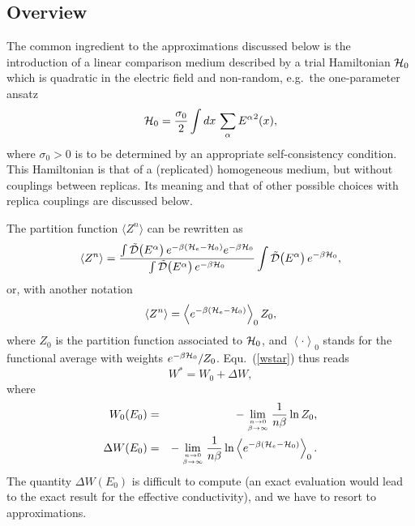 \subsection{Overview}
\label{o}
 The common ingredient to the approximations discussed
below is the introduction of a linear comparison medium
described by a trial Hamiltonian ${\cal H}_0$ which is quadratic in the
electric field and non-random, e.g.\ the one-parameter ansatz
\begin{equation}
\label{trybrug}
{\cal H}_0=\frac{\sigma_0}{2}\int dx\,\sum_{\alpha}{E^{\alpha}}^2(x),
\end{equation}
where $\sigma_0>0$ is to be determined by an 
appropriate self-consistency condition. 
This Hamiltonian is that of a (replicated) homogeneous medium, 
but without couplings between replicas. Its meaning and that of 
other possible choices with replica couplings are discussed below.

The partition function $\langle Z^n\rangle$ can be rewritten as
\begin{equation}
\left\langle Z^n\right\rangle =
\frac{
\int{\tilde{\cal D}}\bigl(E^{\alpha}\bigr)\, e^{-\beta({\cal
H}_e-{\cal H}_0)}e^{-\beta{\cal H}_0}
}{
\int{\tilde{\cal D}}\bigl(E^{\alpha}\bigr)\,e^{-\beta{\cal H}_0}
}
\int{\tilde{\cal D}}\bigl(E^{\alpha}\bigr)\,e^{-\beta{\cal H}_0}
,
\end{equation}
or, with another notation
\begin{equation}
\label{znmoyen2}
\left\langle Z^n\right\rangle =
\left\langle
e^{-\beta({\cal H}_e-{\cal H}_0)}
\right\rangle_0 Z_0,
\end{equation}
where $Z_0$ is the partition function associated to ${\cal H}_0$, and
$\left\langle\cdot\right\rangle_0$ stands for the functional average with
weights $e^{-\beta{\cal H}_0}/Z_0$. Equ.\ (\ref{wstar}) thus reads
\begin{equation}
\label{wsplit}
W^*=W_0+\Delta W,
\end{equation}
where
\begin{eqnarray}
\label{wo}
W_0(E_0)&=&-\lim_{n\to 0\atop
\beta\to\infty}\frac{1}{n\beta}\ln Z_0,\\
\label{dwo}
\Delta W(E_0)&=&-\lim_{n\to 0\atop \beta\to\infty}\frac{1}{n\beta}
\ln \left\langle e^{-\beta({\cal H}_e-{\cal H}_0)}
\right\rangle_0.
\end{eqnarray}
The quantity $\Delta W(E_0)$ is difficult to compute (an exact evaluation
would lead to the exact result for the effective conductivity),
and we have to resort to approximations.

